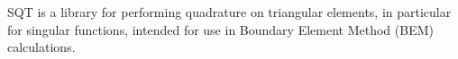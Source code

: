 S\+Q\+T is a library for performing quadrature on triangular elements, in particular for singular functions, intended for use in Boundary Element Method (B\+E\+M) calculations. 